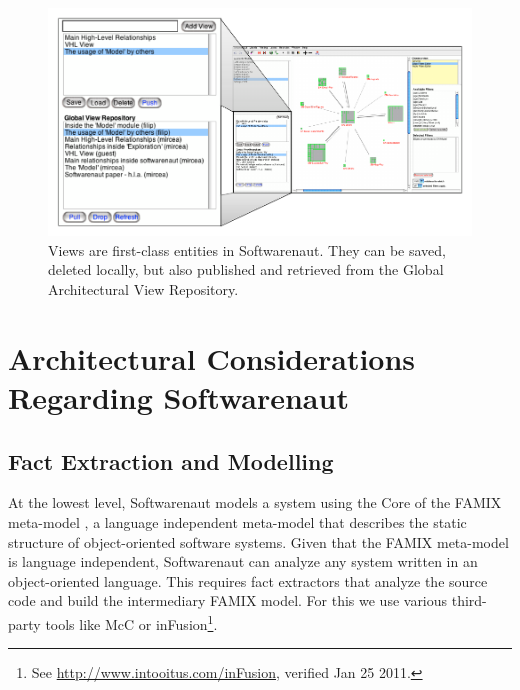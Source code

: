 \documentclass[preprint,12pt]{elsarticle}
\begin{document}
\begin{figure}[h]
\begin{center}
\includegraphics[width=\linewidth]{ViewOperations}
\caption{Views are first-class entities in Softwarenaut. They can be saved, deleted locally, but also published and retrieved from the Global Architectural View Repository.}
\end{center}
\end{figure}









\newpage
\section {Architectural Considerations Regarding Softwarenaut}


\subsection {Fact Extraction and Modelling} \label{sec:facts}

At the lowest level, Softwarenaut models a system using the Core of the FAMIX meta-model \cite{tichelaar-thesis}, a language independent meta-model that describes the static structure of object-oriented software systems. 
Given that the FAMIX meta-model is language independent, Softwarenaut can analyze any system written in an object-oriented language. This requires fact extractors that analyze the source code and build the intermediary FAMIX model. For this we use various third-party tools like McC \cite{pepi-mcc} or inFusion\footnote{See \url{http://www.intooitus.com/inFusion}, verified Jan 25 2011.}.
\end{document}
